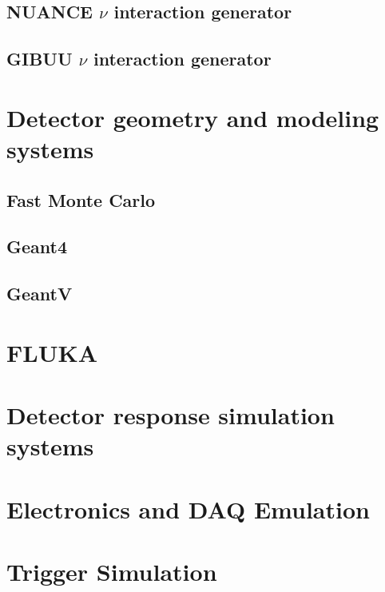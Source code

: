 \subsection{NUANCE $\nu$ interaction generator}

\subsection{GIBUU $\nu$ interaction generator}


\section{Detector geometry and modeling systems}

\subsection{Fast Monte Carlo}

\subsection{Geant4}

\subsection{GeantV}

\section{FLUKA}

\section{Detector response simulation systems}

\section{Electronics and DAQ Emulation}

\section{Trigger Simulation}
